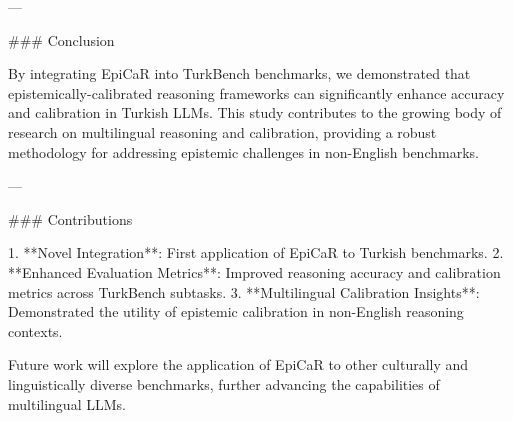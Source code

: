 ---

### Conclusion  

By integrating EpiCaR into TurkBench benchmarks, we demonstrated that epistemically-calibrated reasoning frameworks can significantly enhance accuracy and calibration in Turkish LLMs. This study contributes to the growing body of research on multilingual reasoning and calibration, providing a robust methodology for addressing epistemic challenges in non-English benchmarks.

---

### Contributions  

1. **Novel Integration**: First application of EpiCaR to Turkish benchmarks.  
2. **Enhanced Evaluation Metrics**: Improved reasoning accuracy and calibration metrics across TurkBench subtasks.  
3. **Multilingual Calibration Insights**: Demonstrated the utility of epistemic calibration in non-English reasoning contexts.

Future work will explore the application of EpiCaR to other culturally and linguistically diverse benchmarks, further advancing the capabilities of multilingual LLMs.